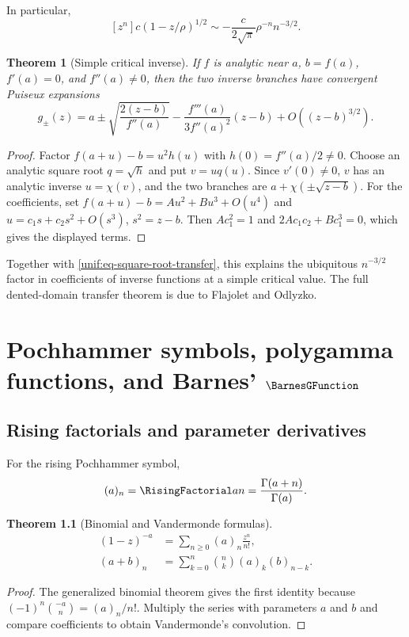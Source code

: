 \documentclass[11pt,a4paper,oneside,openany]{book}
\newtheorem{theorem}{Theorem}[chapter]
\theoremstyle{definition}
\theoremstyle{remark}
\begin{document}
In particular,
\begin{equation}\label{unif:eq-square-root-transfer}
 [z^n]c(1-z/\rho)^{1/2}
 \sim-\frac{c}{2\sqrt\pi}\rho^{-n}n^{-3/2}.
\end{equation}

\begin{theorem}[Simple critical inverse]
\label{unif:thm-critical-inverse}
If $f$ is analytic near $a$, $b=f(a)$, $f'(a)=0$, and $f''(a)\ne0$, then the
two inverse branches have convergent Puiseux expansions
\begin{equation}\label{unif:eq-critical-inverse-expansion}
 g_{\pm}(z)=a\pm\sqrt{\frac{2(z-b)}{f''(a)}}
 -\frac{f'''(a)}{3f''(a)^2}(z-b)+O((z-b)^{3/2}).
\end{equation}
\end{theorem}
\begin{proof}
Factor
$f(a+u)-b=u^2h(u)$ with $h(0)=f''(a)/2\ne0$. Choose an analytic square root
$q=\sqrt h$ and put $v=uq(u)$. Since $v'(0)\ne0$, $v$ has an analytic inverse
$u=\chi(v)$, and the two branches are
$a+\chi(\pm\sqrt{z-b})$. For the coefficients, set
$f(a+u)-b=Au^2+Bu^3+O(u^4)$ and
$u=c_1s+c_2s^2+O(s^3)$, $s^2=z-b$. Then
$Ac_1^2=1$ and $2Ac_1c_2+Bc_1^3=0$, which gives the displayed terms.
\end{proof}

Together with \eqref{unif:eq-square-root-transfer}, this explains the ubiquitous
$n^{-3/2}$ factor in coefficients of inverse functions at a simple critical
value. The full dented-domain transfer theorem is due to Flajolet and Odlyzko.

\chapter{Pochhammer symbols, polygamma functions, and Barnes' \texorpdfstring{$\BarnesGFunction$}{G}}

\section{Rising factorials and parameter derivatives}

For the rising Pochhammer symbol,
\begin{equation}\label{unif:eq-pochhammer-gamma}
 (a)_n=\RisingFactorial an=\frac{\Gamma(a+n)}{\Gamma(a)}.
\end{equation}

\begin{theorem}[Binomial and Vandermonde formulas]
\begin{align}
 (1-z)^{-a}&=\sum_{n\ge0}(a)_n\frac{z^n}{n!},
 \label{unif:eq-pochhammer-binomial}\\
 (a+b)_n&=\sum_{k=0}^{n}\binom nk(a)_k(b)_{n-k}.
 \label{unif:eq-pochhammer-vandermonde}
\end{align}
\end{theorem}
\begin{proof}
The generalized binomial theorem gives the first identity because
$(-1)^n\binom{-a}{n}=(a)_n/n!$. Multiply the series with parameters $a$ and
$b$ and compare coefficients to obtain Vandermonde's convolution.
\end{proof}
\end{document}
